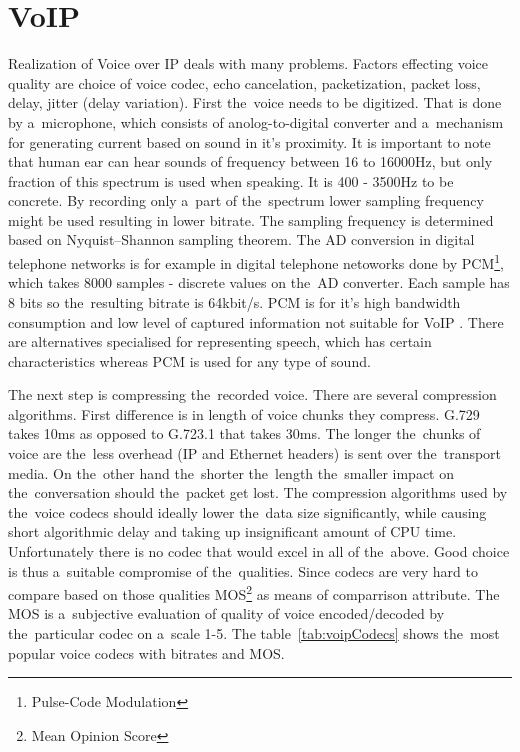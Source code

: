 \section{VoIP}
Realization of Voice over IP deals with many problems. Factors effecting voice quality are choice of voice codec, echo cancelation, packetization, packet loss, delay, jitter (delay variation). First the~voice needs to be digitized. That is done by a~microphone, which consists of anolog-to-digital converter and a~mechanism for generating current based on sound in it's proximity. It is important to note that human ear can hear sounds of frequency between 16 to 16000Hz, but only fraction of this spectrum is used when speaking. It is 400 - 3500Hz to be concrete. By recording only a~part of the~spectrum lower sampling frequency might be used resulting in lower bitrate. The sampling frequency is determined based on Nyquist–Shannon sampling theorem. The AD conversion in digital telephone networks is for example in digital telephone netoworks done by PCM\footnote{Pulse-Code Modulation}, which takes 8000 samples - discrete values on the~AD converter. Each sample has 8 bits so the~resulting bitrate is 64kbit/s. PCM is for it's high bandwidth consumption and low level of captured information not suitable for VoIP \cite{digitalSpeechBook}. There are alternatives specialised for representing speech, which has certain characteristics whereas PCM is used for any type of sound.  
 
The next step is compressing the~recorded voice. There are several compression algorithms. First difference is in length of voice chunks they compress. G.729 takes 10ms as opposed to G.723.1 that takes 30ms. The longer the~chunks of voice are the~less overhead (IP and Ethernet headers) is sent over the~transport media. On the~other hand the~shorter the~length the~smaller impact on the~conversation should the~packet get lost. The compression algorithms used by the~voice codecs should ideally lower the~data size significantly, while causing short algorithmic delay and taking up insignificant amount of CPU time. Unfortunately there is no codec that would excel in all of the~above. Good choice is thus a~suitable compromise of the~qualities. Since codecs are very hard to compare based on those qualities MOS\footnote{Mean Opinion Score} as means of comparrison attribute. The MOS is a~subjective evaluation of quality of voice encoded/decoded by the~particular codec on a~scale 1-5. The table~\ref{tab:voipCodecs} shows the~most popular voice codecs with bitrates and MOS. 

